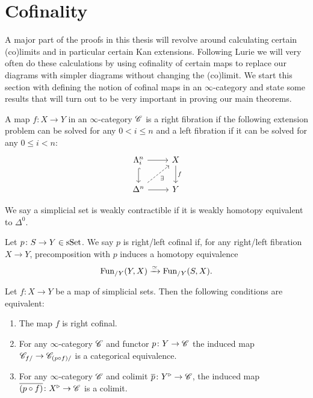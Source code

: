 \documentclass[../../thesis.tex]{subfiles}
\begin{document}
\section{Cofinality}
A major part of the proofs in this thesis will revolve around calculating certain (co)limits and in particular certain Kan extensions.
Following Lurie we will very often do these calculations by using cofinality of certain maps to replace our diagrams with simpler diagrams without changing the (co)limit.
We start this section with defining the notion of cofinal maps in an $\infty$-category and state some results that will turn out to be very important in proving our main theorems.
\begin{definition}
    A map $f\colon X \to Y$ in an $\infty$-category $\mathscr{C}$ is a right fibration if the following extension problem can be solved for any $0<i\leq n$ and a left fibration if it can be solved for any $0\leq i <n$:
    \[\begin{tikzcd}
            {\Lambda_i^n} & X \\
            {\Delta^n} & Y
            \arrow[from=1-1, to=1-2]
            \arrow[hook, from=1-1, to=2-1]
            \arrow[from=2-1, to=2-2]
            \arrow["f", from=1-2, to=2-2]
            \arrow["\exists"', dashed, from=2-1, to=1-2]
        \end{tikzcd}\]
\end{definition}
\begin{definition}
    We say a simplicial set is weakly contractible if it is weakly homotopy equivalent to $\Delta^0$.
\end{definition}
\begin{definition}{\cite[\href{https://kerodon.net/tag/02N1}{Definition 02N1}]{kerodon}}
    Let \(p\colon S\to Y \in \mathrm{sSet} \). We say $p$ is right/left cofinal if, for any right/left fibration $X\to Y$, precomposition with $p$ induces a homotopy equivalence
    \[
        \mathrm{Fun}_{/Y}(Y,X) \xrightarrow{\simeq} \mathrm{Fun}_{/Y}(S,X).
    \]
\end{definition}
\begin{proposition}
    Let $f\colon X \to Y$ be a map of simplicial sets.
    Then the following conditions are equivalent:
    \begin{enumerate}
        \item The map $f$ is right cofinal.
        \item For any $\infty$-category $\mathscr{C}$ and functor $p\colon Y \to \mathscr{C}$ the induced map $\mathscr{C}_{f/} \to \mathscr{C}_{(p \circ f)/}$ is a categorical equivalence.
        \item For any $\infty$-category $\mathscr{C}$ and colimit $\overline{p}\colon Y^{\triangleright} \to \mathscr{C}$, the induced map $\overline{(p \circ f)}\colon X^{\triangleright}\to \mathscr{C}$ is a colimit.
    \end{enumerate}
\end{proposition}
\end{document}
